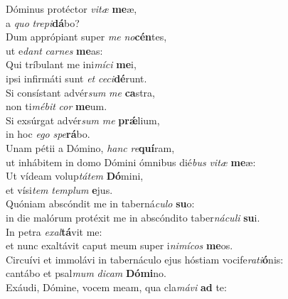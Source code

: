 \evenverse Dóminus protéctor \textit{vi}\textit{tæ} \textbf{me}æ,~\*\\
\evenverse a \textit{quo} \textit{tre}\textit{pi}\textbf{dá}bo?\\
\oddverse Dum apprópiant super \textit{me} \textit{no}\textbf{cén}tes,~\*\\
\oddverse ut e\textit{dant} \textit{car}\textit{nes} \textbf{me}as:\\
\evenverse Qui tríbulant me ini\textit{mí}\textit{ci} \textbf{me}i,~\*\\
\evenverse ipsi infirmáti sunt \textit{et} \textit{ce}\textit{ci}\textbf{dé}runt.\\
\oddverse Si consístant advér\textit{sum} \textit{me} \textbf{ca}stra,~\*\\
\oddverse non ti\textit{mé}\textit{bit} \textit{cor} \textbf{me}um.\\
\evenverse Si exsúrgat advér\textit{sum} \textit{me} \textbf{prǽ}lium,~\*\\
\evenverse in hoc \textit{e}\textit{go} \textit{spe}\textbf{rá}bo.\\
\oddverse Unam pétii a Dómino, \textit{hanc} \textit{re}\textbf{quí}ram,~\*\\
\oddverse ut inhábitem in domo Dómini ómnibus dié\textit{bus} \textit{vi}\textit{tæ} \textbf{me}æ:\\
\evenverse Ut vídeam volup\textit{tá}\textit{tem} \textbf{Dó}mini,~\*\\
\evenverse et vísi\textit{tem} \textit{tem}\textit{plum} \textbf{e}jus.\\
\oddverse Quóniam abscóndit me in taberná\textit{cu}\textit{lo} \textbf{su}o:~\*\\
\oddverse in die malórum protéxit me in abscóndito taber\textit{ná}\textit{cu}\textit{li} \textbf{su}i.\\
\evenverse In petra \textit{e}\textit{xal}\textbf{tá}vit me:~\*\\
\evenverse et nunc exaltávit caput meum super i\textit{ni}\textit{mí}\textit{cos} \textbf{me}os.\\
\oddverse Circuívi et immolávi in tabernáculo ejus hóstiam vocife\textit{ra}\textit{ti}\textbf{ó}nis:~\*\\
\oddverse cantábo et psal\textit{mum} \textit{di}\textit{cam} \textbf{Dó}\textbf{mi}no.\\
\evenverse Exáudi, Dómine, vocem meam, qua cla\textit{má}\textit{vi} \textbf{ad} te:~\*\\
